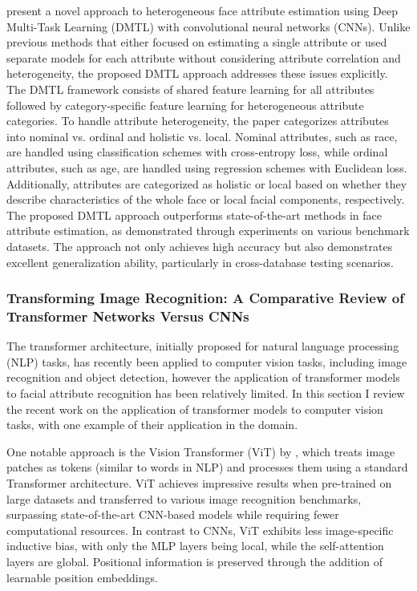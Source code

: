 \documentclass[a4paper,oneside]{article}
\begin{document}
\citet{DBLP:journals/corr/HanJSC17} present a novel approach to heterogeneous face attribute estimation using Deep Multi-Task Learning (DMTL) with convolutional neural networks (CNNs).
Unlike previous methods that either focused on estimating a single attribute or used separate models for each attribute without considering attribute correlation and heterogeneity, the proposed DMTL approach addresses these issues explicitly.
The DMTL framework consists of shared feature learning for all attributes followed by category-specific feature learning for heterogeneous attribute categories.
To handle attribute heterogeneity, the paper categorizes attributes into nominal vs. ordinal and holistic vs. local.
Nominal attributes, such as race, are handled using classification schemes with cross-entropy loss, while ordinal attributes, such as age, are handled using regression schemes with Euclidean loss.
Additionally, attributes are categorized as holistic or local based on whether they describe characteristics of the whole face or local facial components, respectively.
The proposed DMTL approach outperforms state-of-the-art methods in face attribute estimation, as demonstrated through experiments on various benchmark datasets.
The approach not only achieves high accuracy but also demonstrates excellent generalization ability, particularly in cross-database testing scenarios.

\subsubsection{Transforming Image Recognition: A Comparative Review of Transformer Networks Versus CNNs}
The transformer architecture, initially proposed for natural language processing (NLP) tasks, has recently been applied to computer vision tasks, including image recognition and object detection,
however the application of transformer models to facial attribute recognition has been relatively limited.
In this section I review the recent work on the application of transformer models to computer vision tasks, with one example of their application in the domain.

One notable approach is the Vision Transformer (ViT) by \citet{DBLP:journals/corr/abs-2010-11929}, which treats image patches as tokens (similar to words in NLP) and processes them using a standard Transformer architecture.
ViT achieves impressive results when pre-trained on large datasets and transferred to various image recognition benchmarks, surpassing state-of-the-art CNN-based models while requiring fewer computational resources.
In contrast to CNNs, ViT exhibits less image-specific inductive bias, with only the MLP layers being local, while the self-attention layers are global.
Positional information is preserved through the addition of learnable position embeddings. 
\end{document}
